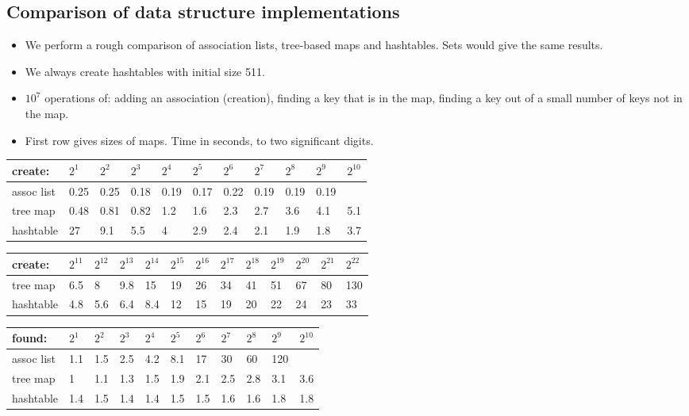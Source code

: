 \documentclass{beamer}
\begin{document}
\subsection{Comparison of data structure implementations}

\begin{itemize}
  \item We perform a rough comparison of association lists, tree-based maps
  and hashtables. Sets would give the same results.
  
  \item We always create hashtables with initial size 511.
  
  \item $10^7$ operations of: adding an association (creation), finding a key
  that is in the map, finding a key out of a small number of keys not in the
  map.
  
  \item First row gives sizes of maps. Time in seconds, to two significant
  digits.
\end{itemize}
\begin{tabular}{|l|l|l|l|l|l|l|l|l|l|l|}
  \hline
  create: & $2^1$ & $2^2$ & $2^3$ & $2^4$ & $2^5$ & $2^6$ & $2^7$ & $2^8$ &
  $2^9$ & $2^{10}$\\
  \hline
  assoc list & 0.25 & 0.25 & 0.18 & 0.19 & 0.17 & 0.22 & 0.19 & 0.19 & 0.19 &
  \\
  \hline
  tree map & 0.48 & 0.81 & 0.82 & 1.2 & 1.6 & 2.3 & 2.7 & 3.6 & 4.1 & 5.1\\
  \hline
  hashtable & 27 & 9.1 & 5.5 & 4 & 2.9 & 2.4 & 2.1 & 1.9 & 1.8 & 3.7\\
  \hline
\end{tabular}

\begin{tabular}{|l|l|l|l|l|l|l|l|l|l|l|l|l|}
  \hline
  create: & $2^{11}$ & $2^{12}$ & $2^{13}$ & $2^{14}$ & $2^{15}$ & $2^{16}$ &
  $2^{17}$ & $2^{18}$ & $2^{19}$ & $2^{20}$ & $2^{21}$ & $2^{22}$\\
  \hline
  tree map & 6.5 & 8 & 9.8 & 15 & 19 & 26 & 34 & 41 & 51 & 67 & 80 & 130\\
  \hline
  hashtable & 4.8 & 5.6 & 6.4 & 8.4 & 12 & 15 & 19 & 20 & 22 & 24 & 23 & 33\\
  \hline
\end{tabular}

\begin{tabular}{|l|l|l|l|l|l|l|l|l|l|l|}
  \hline
  found: & $2^1$ & $2^2$ & $2^3$ & $2^4$ & $2^5$ & $2^6$ & $2^7$ & $2^8$ &
  $2^9$ & $2^{10}$\\
  \hline
  assoc list & 1.1 & 1.5 & 2.5 & 4.2 & 8.1 & 17 & 30 & 60 & 120 & \\
  \hline
  tree map & 1 & 1.1 & 1.3 & 1.5 & 1.9 & 2.1 & 2.5 & 2.8 & 3.1 & 3.6\\
  \hline
  hashtable & 1.4 & 1.5 & 1.4 & 1.4 & 1.5 & 1.5 & 1.6 & 1.6 & 1.8 & 1.8\\
  \hline
\end{tabular}
\end{document}
